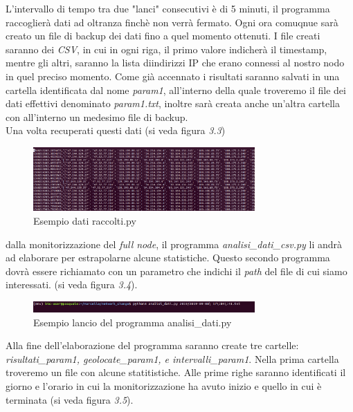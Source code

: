 L'intervallo di tempo tra due "lanci" consecutivi \`e di 5 minuti, il programma raccoglier\`a dati ad oltranza finch\`e non verr\`a fermato. Ogni ora comuqnue sar\`a creato un file di backup dei dati fino a quel momento ottenuti.
I file creati saranno dei \textit{CSV}, in cui in ogni riga, il primo valore indicher\`a il timestamp, mentre gli altri, saranno la lista diindirizzi  IP che erano connessi al nostro nodo in quel preciso momento.
Come gi\`a accennato i risultati saranno salvati in una cartella identificata dal nome \textit{param1}, all'interno della quale troveremo il file dei dati effettivi denominato \textit{param1.txt}, inoltre sar\`a creata anche un'altra cartella con all'interno un medesimo file di backup.\\
Una volta recuperati questi dati  (si veda figura \textit{3.3}) 
\begin{figure}[htb]
\begin{center}
   \includegraphics[width=0.755\textwidth]{imgs/dati_csv.png}
   \caption{Esempio dati raccolti.py}
   \end{center}
   \hfill
\end{figure}
dalla monitorizzazione del \textit{full node}, il programma \textit{analisi\_dati\_csv.py} li andr\`a ad elaborare per estrapolarne alcune statistiche. Questo secondo programma dovr\`a essere richiamato con un parametro che indichi il \textit{path} del file di cui siamo interessati. (si veda figura \textit{3.4}).\\
\begin{figure}[htb]
\begin{center}
   \includegraphics[width=0.755\textwidth]{imgs/analisi_dati.png}
   \caption{Esempio lancio del programma analisi\_dati.py}
   \end{center}
   \hfill
\end{figure}
Alla fine dell'elaborazione del programma saranno create tre cartelle: \textit{risultati\_param1, geolocate\_param1, e intervalli\_param1}.
Nella prima cartella troveremo un file con alcune statitistiche. Alle prime righe saranno identificati il giorno e l'orario in cui la monitorizzazione ha avuto inizio e quello in cui \`e terminata (si veda figura \textit{3.5}).
